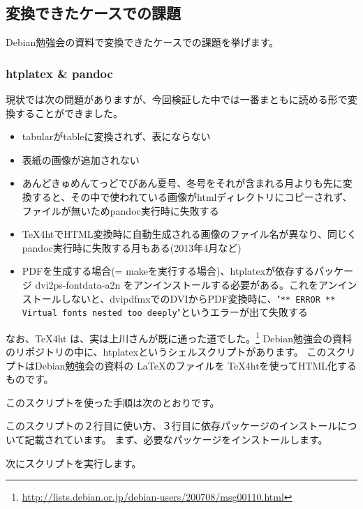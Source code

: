 \documentclass[mingoth,a4paper]{jsarticle}
\begin{document}
\subsection{変換できたケースでの課題}

Debian勉強会の資料で変換できたケースでの課題を挙げます。

\subsubsection{htplatex \& pandoc}

現状では次の問題がありますが、今回検証した中では一番まともに読める形で変換することができました。

\begin{itemize}
  \item tabularがtableに変換されず、表にならない
  \item 表紙の画像が追加されない
  \item あんどきゅめんてっどでびあん夏号、冬号をそれが含まれる月よりも先に変換すると、その中で使われている画像がhtmlディレクトリにコピーされず、ファイルが無いためpandoc実行時に失敗する
  \item \TeX4htでHTML変換時に自動生成される画像のファイル名が異なり、同じくpandoc実行時に失敗する月もある(2013年4月など)
  \item PDFを生成する場合(= makeを実行する場合)、htplatexが依存するパッケージ dvi2ps-fontdata-a2n をアンインストールする必要がある。これをアンインストールしないと、dvipdfmxでのDVIからPDF変換時に、"\texttt{** ERROR ** Virtual fonts nested too deeply}"というエラーが出て失敗する
\end{itemize}

なお、\TeX4ht は、実は上川さんが既に通った道でした。\footnote{\url{http://lists.debian.or.jp/debian-users/200708/msg00110.html}}
Debian勉強会の資料のリポジトリの中に、htplatexというシェルスクリプトがあります。
このスクリプトはDebian勉強会の資料の \LaTeX のファイルを \TeX4htを使ってHTML化するものです。

このスクリプトを使った手順は次のとおりです。

このスクリプトの２行目に使い方、３行目に依存パッケージのインストールについて記載されています。
まず、必要なパッケージをインストールします。


次にスクリプトを実行します。
\end{document}
